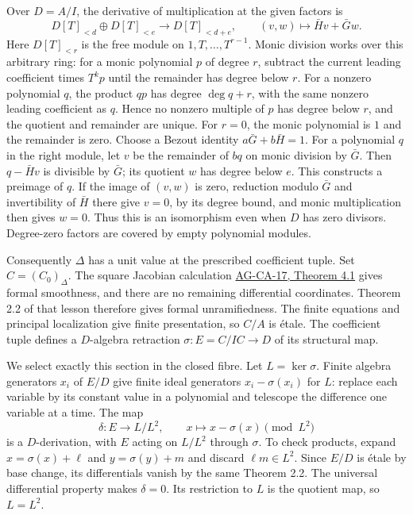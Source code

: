 \documentclass[11pt,a4paper,openany]{report}
\begin{document}
Over \(D=A/I\), the derivative of multiplication at the given factors is \[
D[T]_{<d}\oplus D[T]_{<e}\longrightarrow D[T]_{<d+e},
\qquad (v,w)\longmapsto\bar H v+\bar G w.
\] Here \(D[T]_{<r}\) is the free module on \(1,T,\ldots,T^{r-1}\). Monic division works over this arbitrary ring: for a monic polynomial \(p\) of degree \(r\), subtract the current leading coefficient times \(T^k p\) until the remainder has degree below \(r\). For a nonzero polynomial \(q\), the product \(qp\) has degree \(\deg q+r\), with the same nonzero leading coefficient as \(q\). Hence no nonzero multiple of \(p\) has degree below \(r\), and the quotient and remainder are unique. For \(r=0\), the monic polynomial is \(1\) and the remainder is zero. Choose a Bezout identity \(a\bar G+b\bar H=1\). For a polynomial \(q\) in the right module, let \(v\) be the remainder of \(bq\) on monic division by \(\bar G\). Then \(q-\bar H v\) is divisible by \(\bar G\); its quotient \(w\) has degree below \(e\). This constructs a preimage of \(q\). If the image of \((v,w)\) is zero, reduction modulo \(\bar G\) and invertibility of \(\bar H\) there give \(v=0\), by its degree bound, and monic multiplication then gives \(w=0\). Thus this is an isomorphism even when \(D\) has zero divisors. Degree-zero factors are covered by empty polynomial modules.

Consequently \(\Delta\) has a unit value at the prescribed coefficient tuple. Set \(C=(C_0)_\Delta\). The square Jacobian calculation \href{https://github.com/KokunoYumeto/open-math-courses/blob/d02d0a3669f42579db037cd44de1d113fdd770a1/docs/courses/AG-CA/src/formally-smooth-unramified-and-etale-ring-maps.md}{AG-CA-17, Theorem 4.1} gives formal smoothness, and there are no remaining differential coordinates. Theorem 2.2 of that lesson therefore gives formal unramifiedness. The finite equations and principal localization give finite presentation, so \(C/A\) is étale. The coefficient tuple defines a \(D\)-algebra retraction \(\sigma:E=C/IC\to D\) of its structural map.

We select exactly this section in the closed fibre. Let \(L=\ker\sigma\). Finite algebra generators \(x_i\) of \(E/D\) give finite ideal generators \(x_i-\sigma(x_i)\) for \(L\): replace each variable by its constant value in a polynomial and telescope the difference one variable at a time. The map \[
\delta:E\longrightarrow L/L^2,\qquad
x\longmapsto x-\sigma(x)\pmod {L^2}
\] is a \(D\)-derivation, with \(E\) acting on \(L/L^2\) through \(\sigma\). To check products, expand \(x=\sigma(x)+\ell\) and \(y=\sigma(y)+m\) and discard \(\ell m\in L^2\). Since \(E/D\) is étale by base change, its differentials vanish by the same Theorem 2.2. The universal differential property makes \(\delta=0\). Its restriction to \(L\) is the quotient map, so \(L=L^2\).
\end{document}
